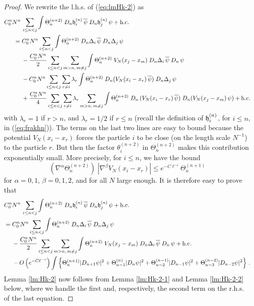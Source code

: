 \documentclass[11pt]{article}
\newcommand{\eps}{\varepsilon}
\newcommand{\fh}{{\frak h}}
\begin{document}
\begin{proof}
We rewrite the l.h.s. of (\ref{eq:lmHk-2}) as
\begin{equation}
\begin{split}
C_0^n N^n \, &\sum_{i\leq n < j} \int \Theta^{(n+2)}_n \; D_n
\fh^{(n)}_i \, \overline{\psi} \; D_n \fh^{(n)}_j \, \psi +\text{h.c.} \\
= \; &C_0^n N^n \sum_{i\leq n < j} \int \Theta^{(n+2)}_n \; D_n
\Delta_i \, \overline{\psi} \; D_n \Delta_j \, \psi  \\ &-
\frac{C_0^n N^n}{2} \sum_{i\leq n < j} \sum_{m > n, \, m \neq j}
\int \Theta^{(n+2)}_n \; V_N (x_j -x_m) \; D_n \Delta_i \,
\overline{\psi} \; D_n \, \psi \\
 &- C_0^n N^n \sum_{i\leq n < j} \sum_{r \neq i} \lambda_r
 \int \Theta^{(n+2)}_n
\; D_n (V_N (x_i-x_r) \, \overline{\psi}) \; D_n \Delta_j \, \psi \\
&+ \frac{C_0^n N^n}{4} \sum_{i\leq n < j} \sum_{r \neq i} \lambda_r
\sum_{m>n,\, m \neq j} \int \Theta^{(n+2)}_n \; D_n \, (V_N (x_i
-x_r) \, \overline{\psi}) \; D_n (V_N (x_j-x_m) \, \psi)
+\text{h.c.}
\end{split}
\end{equation}
with $\lambda_r =1$ if $r > n$, and $\lambda_r =1/2$ if $r \leq n$
(recall the definition of $\fh_i^{(n)}$, for $i \leq n$, in
(\ref{eq:frakhn})). The terms on the last two lines are easy to
bound because the potential $V_N (x_i -x_r)$ forces the particle $i$
to be close (on the length scale $N^{-1}$) to the particle $r$. But
then the factor $\theta_i^{(n+2)}$ in $\Theta_n^{(n+2)}$ makes this
contribution exponentially small. More precisely, for $i \leq n$, we
have the bound
\begin{equation}
\left(\nabla^{\alpha} \Theta^{(n+2)}_n \right) \; |\nabla^{\beta}
V_N (x_i - x_r)| \leq e^{-C\ell^{-\eps}} \Theta^{(n+1)}_{n}
\end{equation}
for $\alpha =0,1$, $\beta=0,1,2$, and for all $N$ large enough. It
is therefore easy to prove that
\begin{equation*}
\begin{split}
C_0^n &N^n \, \sum_{i\leq n < j} \int \Theta^{(n+2)}_n \; D_n
\fh^{(n)}_i \, \overline{\psi} \; D_n \fh^{(n)}_j \, \psi +\text{h.c.} \\
= \; &C_0^n N^n \sum_{i\leq n < j} \int \Theta^{(n+2)}_n \; D_n
\Delta_i \, \overline{\psi} \; D_n \Delta_j \, \psi  \\ &-
\frac{C_0^n N^n}{2} \sum_{i\leq n < j} \sum_{m >n, \, m \neq j} \int
\Theta^{(n+2)}_n \; V_N (x_j -x_m)\; D_n \Delta_i \,
\overline{\psi} \; D_n  \, \psi +\text{h.c.}\\
&- O \left( e^{-C\ell^{-\eps}} \right)  \int \left\{
\Theta^{(n+1)}_{n} |D_{n+1} \psi|^2 + \Theta^{(n)}_{n-1} |D_n
\psi|^2 + \Theta^{(n-1)}_{n-2} |D_{n-1} \psi|^2 +
\Theta^{(n-2)}_{n-3} |D_{n-2} \psi|^2 \right\}\,.
\end{split}
\end{equation*}
Lemma \ref{lm:Hk-2} now follows from Lemma \ref{lm:Hk-2-1} and Lemma
\ref{lm:Hk-2-2} below, where we handle the first and, respectively,
the second term on the r.h.s. of the last equation.
\end{proof}
\end{document}
